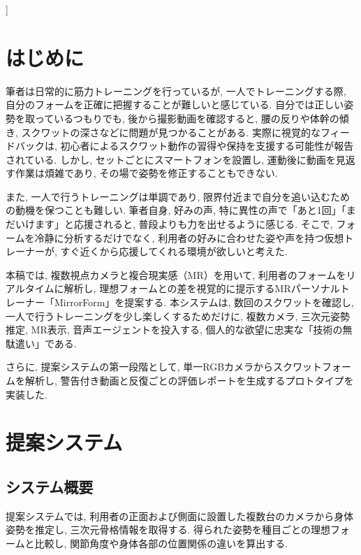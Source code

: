 \documentclass[a4paper,9pt,twocolumn]{jsarticle}
\begin{document}
\vspace{2\baselineskip}
]

\section{はじめに}

筆者は日常的に筋力トレーニングを行っているが, 一人でトレーニングする際, 自分のフォームを正確に把握することが難しいと感じている. 
自分では正しい姿勢を取っているつもりでも, 後から撮影動画を確認すると, 腰の反りや体幹の傾き, スクワットの深さなどに問題が見つかることがある. 
実際に視覚的なフィードバックは, 初心者によるスクワット動作の習得や保持を支援する可能性が報告されている\cite{shin_feedback}. 
しかし, セットごとにスマートフォンを設置し, 運動後に動画を見返す作業は煩雑であり, その場で姿勢を修正することもできない. 

また, 一人で行うトレーニングは単調であり, 限界付近まで自分を追い込むための動機を保つことも難しい. 
筆者自身, 好みの声, 特に異性の声で「あと1回」「まだいけます」と応援されると, 普段よりも力を出せるように感じる. 
そこで, フォームを冷静に分析するだけでなく, 利用者の好みに合わせた姿や声を持つ仮想トレーナーが, すぐ近くから応援してくれる環境が欲しいと考えた. 

本稿では, 複数視点カメラと複合現実感（MR）を用いて, 利用者のフォームをリアルタイムに解析し, 理想フォームとの差を視覚的に提示するMRパーソナルトレーナー「MirrorForm」を提案する. 
本システムは, 数回のスクワットを確認し, 一人で行うトレーニングを少し楽しくするためだけに, 複数カメラ, 三次元姿勢推定, MR表示, 音声エージェントを投入する, 個人的な欲望に忠実な「技術の無駄遣い」である. 

さらに, 提案システムの第一段階として, 単一RGBカメラからスクワットフォームを解析し, 警告付き動画と反復ごとの評価レポートを生成するプロトタイプを実装した. 

\section{提案システム}

\subsection{システム概要}

提案システムでは, 利用者の正面および側面に設置した複数台のカメラから身体姿勢を推定し, 三次元骨格情報を取得する. 
得られた姿勢を種目ごとの理想フォームと比較し, 関節角度や身体各部の位置関係の違いを算出する. 
\end{document}
